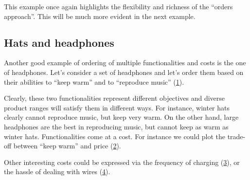 This example once again highlights the flexibility and richness of the ``orders approach''.
This will be much more evident in the next example.



\subsection{Hats and headphones}
Another good example of ordering of multiple functionalities and costs is the one of headphones.
Let's consider a set of headphones and let's order them based on their abilities to ``keep warm'' and to ``reproduce music'' (\cref{fig:headpho_fun}).

\begin{figure}[h!]
  \begin{center}
\end{center}
  \caption{\label{fig:headpho_fun}}
\end{figure}

Clearly, these two functionalities represent different objectives and diverse product ranges will satisfy them in different ways.
For instance, winter hats clearly cannot reproduce music, but keep very warm.
On the other hand, large headphones are the best in reproducing music, but cannot keep as warm as winter hats.
Functionalities come at a cost. For instance we could plot the trade-off between ``keep warm'' and price (\cref{fig:headpho_price}).


\begin{figure}[h!]
  \begin{center}
\end{center}
  \caption{\label{fig:headpho_price}}
\end{figure}

Other interesting costs could be expressed via the frequency of charging (\cref{fig:headpho_charge}), or the hassle of dealing with wires (\cref{fig:headpho_wires}).


\begin{figure}[h!]
  \begin{center}
\end{center}
  \caption{\label{fig:headpho_charge}}
\end{figure}

\begin{figure}[h!]
  \begin{center}
\end{center}
  \caption{\label{fig:headpho_wires}}
\end{figure}

